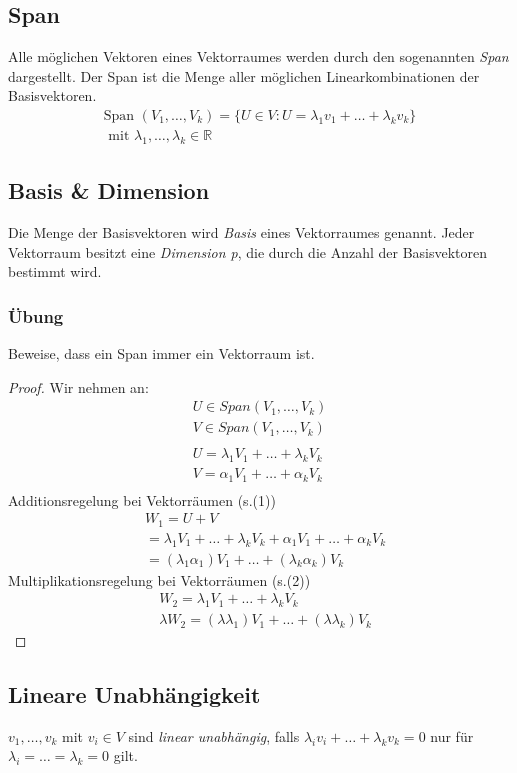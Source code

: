 \subsection{Span}
Alle m\"oglichen Vektoren eines Vektorraumes werden durch den sogenannten \textit{Span} dargestellt. Der Span ist die Menge aller m\"oglichen Linearkombinationen der Basisvektoren.
\begin{align*}
\text{Span }(V_1,\dots,V_k) = \{U \in V : U = \lambda_1v_1+\dots+\lambda_kv_k\} \\
\text{ mit } \lambda_1,\dots,\lambda_k \in \mathbb{R}
\end{align*}
\subsection{Basis \& Dimension}
Die Menge der Basisvektoren wird \textit{Basis} eines Vektorraumes genannt. Jeder Vektorraum besitzt eine \textit{Dimension p}, die durch die Anzahl der Basisvektoren bestimmt wird.
\subsubsection*{\"Ubung}
Beweise, dass ein Span immer ein Vektorraum ist.
\begin{proof}
Wir nehmen an: 
\begin{align*}
U \in Span(V_1,\dots,V_k)\\
V \in Span(V_1,\dots,V_k)\\
\\
U = \lambda_1V_1+\dots+\lambda_kV_k\\
V = \alpha_1V_1+\dots+\alpha_kV_k\\
\end{align*}
Additionsregelung bei Vektorr\"aumen (s.(1))
\begin{align*}
	&W_1 = U+V\\
	&=\lambda_1V_1+\dots+\lambda_kV_k+\alpha_1V_1+\dots+\alpha_kV_k\\
	&= (\lambda_1\alpha_1)V_1+\dots+(\lambda_k\alpha_k)V_k
\end{align*}
Multiplikationsregelung bei Vektorr\"aumen (s.(2))
\begin{align*}
	&W_2 = \lambda_1V_1+\dots+\lambda_kV_k\\
	&\lambda W_2= (\lambda \lambda_1)V_1+\dots+(\lambda\lambda_k)V_k
\end{align*}
\end{proof}
\subsection{Lineare Unabh\"angigkeit}
$v_1,\dots,v_k$ mit $v_i \in V$ sind \textit{linear unabh\"angig}, falls $\lambda_iv_i+\dots+\lambda_kv_k = 0$ nur f\"ur $\lambda_i=\dots=\lambda_k= 0$ gilt. 

%
